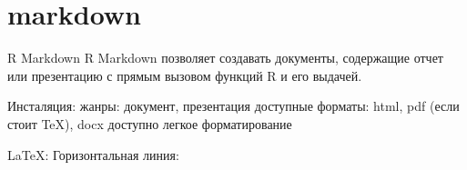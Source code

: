 \section{markdown}
\begin{frame}[fragile]{R Markdown}
R Markdown позволяет создавать документы, содержащие отчет или презентацию с прямым вызовом функций R и его выдачей.
\begin{itemize}
\mytem Инсталяция: \scriptsize {\color{red!13!blue}{\verb'install.packages("rmarkdown")'}} \normalsize
\mytem жанры: документ, презентация
\mytem доступные форматы: html, pdf (если стоит TeX), docx
\mytem доступно легкое форматирование
\end{itemize}
\begin{multicols}{2}
\small
\begin{itemize}
\mytem \scriptsize {\color{red!13!blue}{\verb"*италик*"}} \normalsize
\mytem \scriptsize {\color{red!13!blue}{\verb"_италик_"}} \normalsize
\mytem \scriptsize {\color{red!13!blue}{\verb"**жирный**"}} \normalsize
\mytem \scriptsize {\color{red!13!blue}{\verb"__жирный__"}} \normalsize
\mytem \scriptsize {\color{red!13!blue}{\verb"^надписное^"}} \normalsize
\mytem \scriptsize {\color{red!13!blue}{\verb"~~перечеркнутое~~"}} \normalsize
\mytem \scriptsize {\color{red!13!blue}{\verb"# 1. Заголовок"}} \normalsize
\mytem \scriptsize {\color{red!13!blue}{\verb"## 1.2 Подзаголовок"}} \normalsize
\mytem \LaTeX : \scriptsize {} \normalsize
\mytem Горизонтальная линия: \scriptsize {\color{red!13!blue}{\verb"***"}} \normalsize
\mytem \scriptsize {\color{red!13!blue}{\verb"> отдельный блок"}}
\mytem \scriptsize {\color{red!13!blue}{\verb"* булет"}}
\mytem \scriptsize {\color{red!13!blue}{\verb"+ подбулет"}}
\end{itemize}
\normalsize
\end{multicols}
\end{frame}
